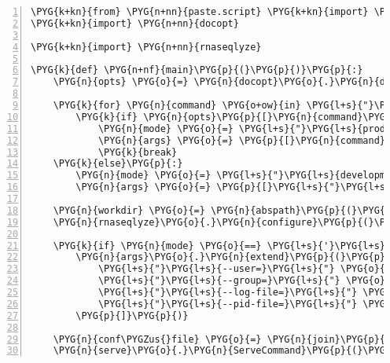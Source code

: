 \begin{Verbatim}[commandchars=\\\{\},numbers=left,firstnumber=1,stepnumber=5]
\PYG{k+kn}{from} \PYG{n+nn}{paste.script} \PYG{k+kn}{import} \PYG{n}{serve}
\PYG{k+kn}{import} \PYG{n+nn}{docopt}

\PYG{k+kn}{import} \PYG{n+nn}{rnaseqlyze}

\PYG{k}{def} \PYG{n+nf}{main}\PYG{p}{(}\PYG{p}{)}\PYG{p}{:}
    \PYG{n}{opts} \PYG{o}{=} \PYG{n}{docopt}\PYG{o}{.}\PYG{n}{docopt}\PYG{p}{(}\PYG{n}{\PYGZus{}\PYGZus{}doc\PYGZus{}\PYGZus{}}\PYG{p}{)}

    \PYG{k}{for} \PYG{n}{command} \PYG{o+ow}{in} \PYG{l+s}{"}\PYG{l+s}{start\textbar{}stop\textbar{}restart}\PYG{l+s}{"}\PYG{o}{.}\PYG{n}{split}\PYG{p}{(}\PYG{l+s}{'}\PYG{l+s}{\textbar{}}\PYG{l+s}{'}\PYG{p}{)}\PYG{p}{:}
        \PYG{k}{if} \PYG{n}{opts}\PYG{p}{[}\PYG{n}{command}\PYG{p}{]}\PYG{p}{:}
            \PYG{n}{mode} \PYG{o}{=} \PYG{l+s}{"}\PYG{l+s}{production}\PYG{l+s}{"}
            \PYG{n}{args} \PYG{o}{=} \PYG{p}{[}\PYG{n}{command}\PYG{p}{,} \PYG{l+s}{"}\PYG{l+s}{--daemon}\PYG{l+s}{"}\PYG{p}{]}
            \PYG{k}{break}
    \PYG{k}{else}\PYG{p}{:}
        \PYG{n}{mode} \PYG{o}{=} \PYG{l+s}{"}\PYG{l+s}{development}\PYG{l+s}{"}
        \PYG{n}{args} \PYG{o}{=} \PYG{p}{[}\PYG{l+s}{"}\PYG{l+s}{--reload}\PYG{l+s}{"}\PYG{p}{]}

    \PYG{n}{workdir} \PYG{o}{=} \PYG{n}{abspath}\PYG{p}{(}\PYG{n}{opts}\PYG{p}{[}\PYG{l+s}{'}\PYG{l+s}{\textless{}workdir\textgreater{}}\PYG{l+s}{'}\PYG{p}{]}\PYG{p}{)}
    \PYG{n}{rnaseqlyze}\PYG{o}{.}\PYG{n}{configure}\PYG{p}{(}\PYG{n}{workdir}\PYG{p}{)}

    \PYG{k}{if} \PYG{n}{mode} \PYG{o}{==} \PYG{l+s}{'}\PYG{l+s}{production}\PYG{l+s}{'}\PYG{p}{:}
        \PYG{n}{args}\PYG{o}{.}\PYG{n}{extend}\PYG{p}{(}\PYG{p}{[}
            \PYG{l+s}{"}\PYG{l+s}{--user=}\PYG{l+s}{"} \PYG{o}{+} \PYG{n}{rnaseqlyze}\PYG{o}{.}\PYG{n}{worker\PYGZus{}user}\PYG{p}{,}
            \PYG{l+s}{"}\PYG{l+s}{--group=}\PYG{l+s}{"} \PYG{o}{+} \PYG{n}{rnaseqlyze}\PYG{o}{.}\PYG{n}{group}\PYG{p}{,}
            \PYG{l+s}{"}\PYG{l+s}{--log-file=}\PYG{l+s}{"} \PYG{o}{+} \PYG{n}{join}\PYG{p}{(}\PYG{n}{workdir}\PYG{p}{,} \PYG{l+s}{'}\PYG{l+s}{worker-daemon.log}\PYG{l+s}{'}\PYG{p}{)}\PYG{p}{,}
            \PYG{l+s}{"}\PYG{l+s}{--pid-file=}\PYG{l+s}{"} \PYG{o}{+} \PYG{n}{join}\PYG{p}{(}\PYG{n}{workdir}\PYG{p}{,} \PYG{l+s}{'}\PYG{l+s}{worker-daemon.pid}\PYG{l+s}{'}\PYG{p}{)}\PYG{p}{,}
        \PYG{p}{]}\PYG{p}{)}

    \PYG{n}{conf\PYGZus{}file} \PYG{o}{=} \PYG{n}{join}\PYG{p}{(}\PYG{n}{workdir}\PYG{p}{,} \PYG{l+s}{'}\PYG{l+s}{worker.ini}\PYG{l+s}{'}\PYG{p}{)}
    \PYG{n}{serve}\PYG{o}{.}\PYG{n}{ServeCommand}\PYG{p}{(}\PYG{l+s}{"}\PYG{l+s}{serve}\PYG{l+s}{"}\PYG{p}{)}\PYG{o}{.}\PYG{n}{run}\PYG{p}{(}\PYG{p}{[}\PYG{n}{conf\PYGZus{}file}\PYG{p}{]} \PYG{o}{+} \PYG{n}{args}\PYG{p}{)}
\end{Verbatim}


